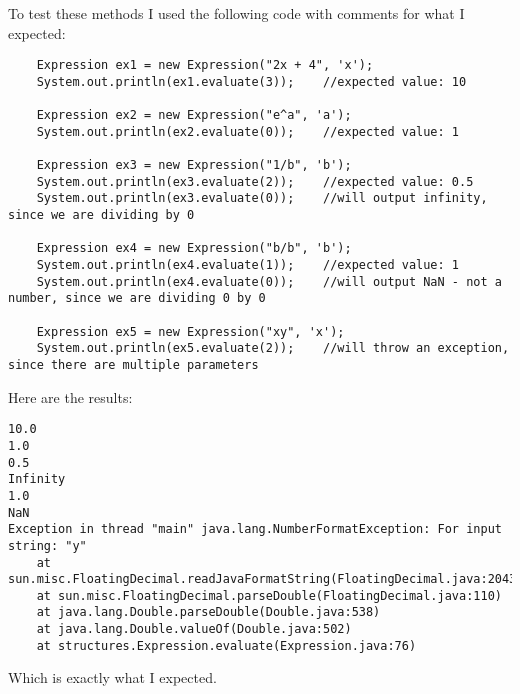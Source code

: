 \documentclass[../../../../main.tex]{subfiles}
\begin{document}
To test these methods I used the following code with comments for what I expected:
\begin{verbatim}
	Expression ex1 = new Expression("2x + 4", 'x');
	System.out.println(ex1.evaluate(3));	//expected value: 10
	
	Expression ex2 = new Expression("e^a", 'a');
	System.out.println(ex2.evaluate(0));	//expected value: 1
	
	Expression ex3 = new Expression("1/b", 'b');
	System.out.println(ex3.evaluate(2));	//expected value: 0.5
	System.out.println(ex3.evaluate(0));	//will output infinity, since we are dividing by 0
	
	Expression ex4 = new Expression("b/b", 'b');
	System.out.println(ex4.evaluate(1));	//expected value: 1
	System.out.println(ex4.evaluate(0));	//will output NaN - not a number, since we are dividing 0 by 0
	
	Expression ex5 = new Expression("xy", 'x');
	System.out.println(ex5.evaluate(2));	//will throw an exception, since there are multiple parameters
\end{verbatim}
Here are the results:
\begin{verbatim}
10.0
1.0
0.5
Infinity
1.0
NaN
Exception in thread "main" java.lang.NumberFormatException: For input string: "y"
	at sun.misc.FloatingDecimal.readJavaFormatString(FloatingDecimal.java:2043)
	at sun.misc.FloatingDecimal.parseDouble(FloatingDecimal.java:110)
	at java.lang.Double.parseDouble(Double.java:538)
	at java.lang.Double.valueOf(Double.java:502)
	at structures.Expression.evaluate(Expression.java:76)
\end{verbatim}
Which is exactly what I expected.
\newpage
\end{document}
